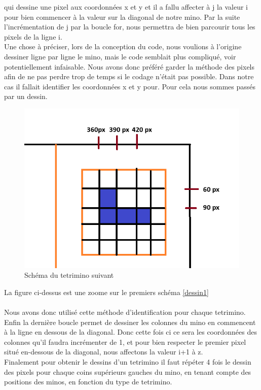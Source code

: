 \documentclass[a4paper,10p]{report}
\begin{document}
qui dessine une pixel aux coordonnées x et y et il a fallu affecter à j la valeur i pour bien commencer à la valeur sur la diagonal de notre mino. Par la suite l'incrémentation de j par la boucle for, nous permettra de bien parcourir tous les pixels de la ligne i.
\\Une chose à préciser, lors de la conception du code, nous voulions à l'origine dessiner ligne par ligne le mino, mais le code semblait plus compliqué, voir potentiellement infaisable. Nous avons donc préféré garder la méthode des pixels afin de ne pas perdre trop de temps si le codage n'était pas possible.
\newpage 
Dans notre cas il fallait identifier les coordonnées x et y pour. Pour cela nous sommes passés par un dessin.
\begin{figure}[ht]
\includegraphics[scale=0.5]{dessin3.png}
\caption{\label{dessin8} Schéma du tetrimino suivant}
\end{figure}
La figure ci-dessus est une zoome sur le premiers schéma \ref{dessin1}
\\\\Nous avons donc utilisé cette méthode d'identification pour chaque tetrimino.
\\Enfin la dernière boucle permet de dessiner les colonnes du mino en commencent à la ligne en dessous de la diagonal. Donc cette fois ci ce sera les coordonnées des colonnes qu'il faudra incrémenter de 1, et pour bien respecter le premier pixel situé en-dessous de la diagonal, nous affectons la valeur i+1 à z.
\\
Finalement pour obtenir le dessins d'un tetrimino il faut répéter 4 fois le dessin des pixels pour chaque coins supérieurs gauches du mino, en tenant compte des positions des minos, en fonction du type de tetrimino.
\end{document}
